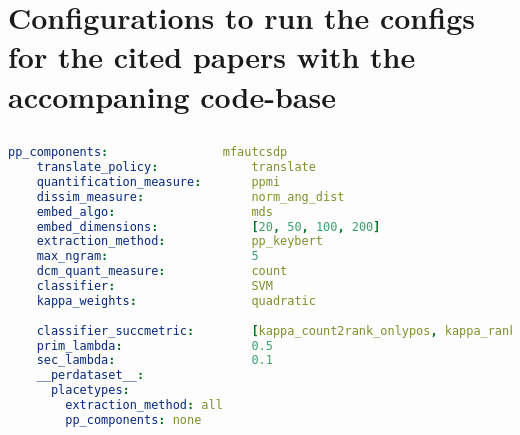 



\chapter{Configurations to run the configs for the cited papers with the accompaning code-base} %

\label{AppendixB} 

\vspace{-0.8cm}

% 

\section{\textcite{Derrac2015}}

\begin{lstlisting}[language=yaml]
    pp_components:                mfautcsdp
    translate_policy:             translate
    quantification_measure:       ppmi
    dissim_measure:               norm_ang_dist
    embed_algo:                   mds
    embed_dimensions:             [20, 50, 100, 200]
    extraction_method:            pp_keybert
    max_ngram:                    5                   
    dcm_quant_measure:            count
    classifier:                   SVM
    kappa_weights:                quadratic
    
    classifier_succmetric:        [kappa_count2rank_onlypos, kappa_rank2rank_onlypos_min] 
    prim_lambda:                  0.5
    sec_lambda:                   0.1
    __perdataset__:
      placetypes:
        extraction_method: all 
        pp_components: none
\end{lstlisting}